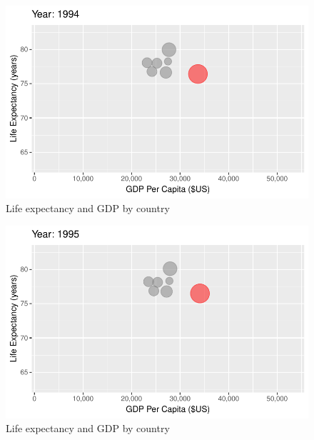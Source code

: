 \documentclass[
  letterpaper,
  DIV=11,
  numbers=noendperiod]{scrreport}
\theoremstyle{definition}
\theoremstyle{remark}
\begin{document}
\begin{figure}

{\centering \includegraphics{index_files/figure-pdf/fig-anim-country-77.pdf}

}

\caption{\label{fig-anim-country-77}Life expectancy and GDP by country}

\end{figure}

\begin{figure}

{\centering \includegraphics{index_files/figure-pdf/fig-anim-country-78.pdf}

}

\caption{\label{fig-anim-country-78}Life expectancy and GDP by country}

\end{figure}
\end{document}
